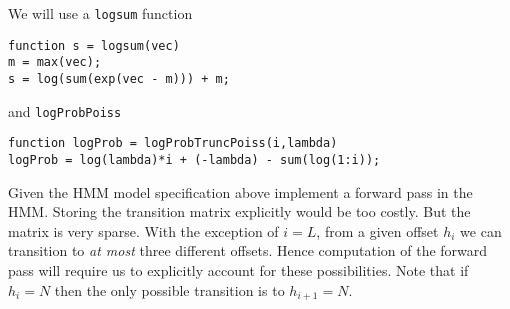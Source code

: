 \documentclass{article}
\begin{document}
We will use a {\tt logsum} function
\begin{verbatim}
function s = logsum(vec)
m = max(vec);
s = log(sum(exp(vec - m))) + m;
\end{verbatim}
and {\tt logProbPoiss}
\begin{verbatim}
function logProb = logProbTruncPoiss(i,lambda)
logProb = log(lambda)*i + (-lambda) - sum(log(1:i));
\end{verbatim}
\begin{center}
\end{center}


\newproblem{3pt} Given the HMM model specification above implement a forward pass in the HMM.
 Storing the transition matrix explicitly would be too costly. But the matrix is very sparse. With the exception of $i=L$, from a given offset $h_i$ we can transition to {\em at most} three different offsets. Hence computation of the forward pass will require us to explicitly account for these possibilities. Note that if $h_i=N$ then the only possible transition is to $h_{i+1}=N$.
\end{document}
